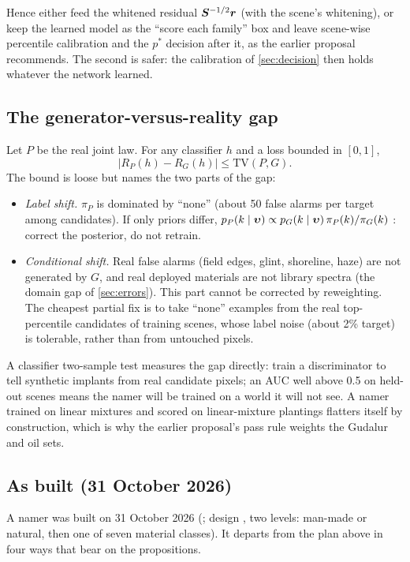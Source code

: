 \documentclass[11pt,a4paper]{article}
\theoremstyle{plain}
\theoremstyle{definition}
\theoremstyle{remark}
\newcommand{\rv}{\B{r}}
\newcommand{\Sm}{\B{S}}
\begin{document}
Hence either feed the whitened residual $\Sm^{-1/2}\rv$ (with the scene's whitening), or keep the learned model as the ``score each
family'' box and leave scene-wise percentile calibration and the $p^\ast$ decision after it, as the earlier proposal recommends.
The second is safer: the calibration of \cref{sec:decision} then holds whatever the network learned.

\subsection{The generator-versus-reality gap}

Let $P$ be the real joint law. For any classifier $h$ and a loss bounded in $[0,1]$,
\[
  |R_P(h)-R_G(h)|\le\mathrm{TV}(P,G) .
\]
The bound is loose but names the two parts of the gap:
\begin{itemize}
\item \emph{Label shift.} $\pi_P$ is dominated by ``none'' (about 50 false alarms per target among candidates). If only priors
differ, $p_P(k\mid\bm{\upsilon})\propto p_G(k\mid\bm{\upsilon})\,\pi_P(k)/\pi_G(k)$ \cite{Saerens2002}: correct the posterior, do
not retrain.
\item \emph{Conditional shift.} Real false alarms (field edges, glint, shoreline, haze) are not generated by $G$, and real deployed
materials are not library spectra (the domain gap of \cref{sec:errors}). This part cannot be corrected by reweighting. The cheapest
partial fix is to take ``none'' examples from the real top-percentile candidates of training scenes, whose label noise (about 2\%
target) is tolerable, rather than from untouched pixels.
\end{itemize}
A classifier two-sample test measures the gap directly: train a discriminator to tell synthetic implants from real candidate
pixels; an AUC well above 0.5 on held-out scenes means the namer will be trained on a world it will not see. A namer trained on linear
mixtures and scored on linear-mixture plantings flatters itself by construction, which is why the earlier proposal's pass rule weights
the Gudalur and oil sets.

\subsection{As built (31 October 2026)}
\label{sec:namer-built}

A namer was built on 31 October 2026 (; design , two levels: man-made or
natural, then one of seven material classes). It departs from the plan above in four ways that bear on the propositions.
\end{document}

